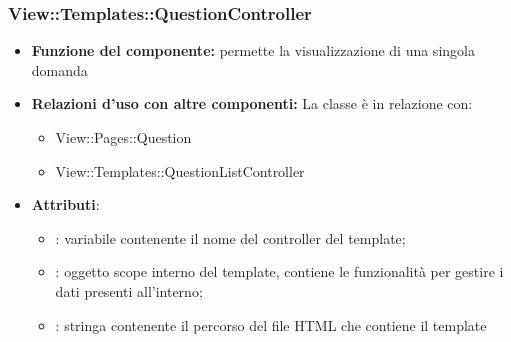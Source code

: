 \subsubsection{View::Templates::QuestionController}
\begin{itemize}
\item\textbf{Funzione del componente:} permette la visualizzazione di una singola domanda
				\item\textbf{Relazioni d'uso con altre componenti:} 
La classe è in relazione con:
\begin{itemize}
		\item View::Pages::Question
		\item View::Templates::QuestionListController
	\end{itemize}
\item\textbf{Attributi}:
	\begin{itemize}
		\item{}: variabile contenente il nome del controller del template;\\
		\item{}: oggetto scope interno del template, contiene le funzionalità per gestire i dati presenti all’interno;\\
		\item{}: stringa contenente il percorso del file HTML che contiene il template\\
	\end{itemize}
\end{itemize}

